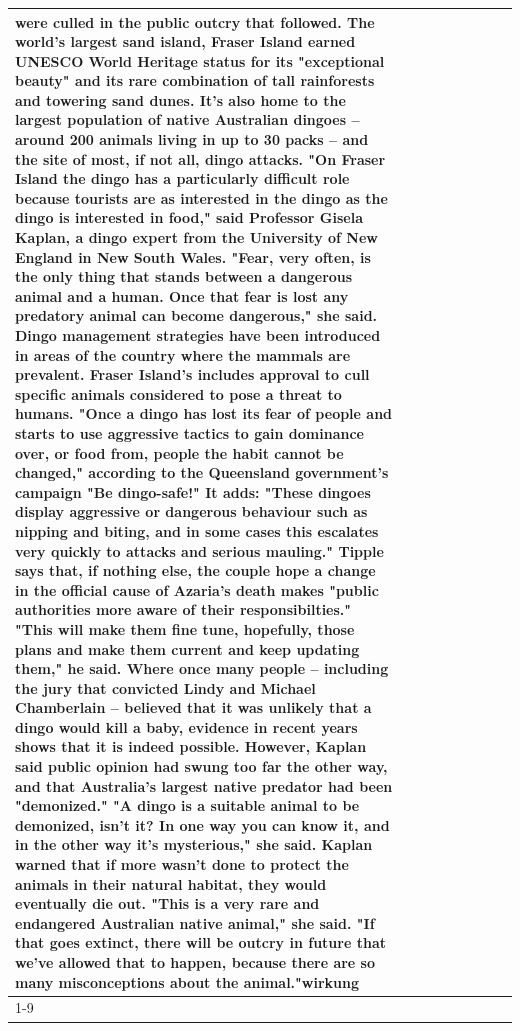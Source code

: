 \begin{table}[H]
\begin{tabular}{lllrlllll}
were culled in the public outcry that followed. The world's largest sand island, Fraser Island earned UNESCO World Heritage status for its "exceptional beauty" and its rare combination of tall rainforests and towering sand dunes. It's also home to the largest population of native Australian dingoes -- around 200 animals living in up to 30 packs -- and the site of most, if not all, dingo attacks. "On Fraser Island the dingo has a particularly difficult role because tourists are as interested in the dingo as the dingo is interested in food," said Professor Gisela Kaplan, a dingo expert from the University of New England in New South Wales. "Fear, very often, is the only thing that stands between a dangerous animal and a human. Once that fear is lost any predatory animal can become dangerous," she said. Dingo management strategies have been introduced in areas of the country where the mammals are prevalent. Fraser Island's includes approval to cull specific animals considered to pose a threat to humans. "Once a dingo has lost its fear of people and starts to use aggressive tactics to gain dominance over, or food from, people the habit cannot be changed," according to the Queensland government's campaign "Be dingo-safe!" It adds: "These dingoes display aggressive or dangerous behaviour such as nipping and biting, and in some cases this escalates very quickly to attacks and serious mauling." Tipple says that, if nothing else, the couple hope a change in the official cause of Azaria's death makes "public authorities more aware of their responsibilties." "This will make them fine tune, hopefully, those plans and make them current and keep updating them," he said. Where once many people -- including the jury that convicted Lindy and Michael Chamberlain -- believed that it was unlikely that a dingo would kill a baby, evidence in recent years shows that it is indeed possible. However, Kaplan said public opinion had swung too far the other way, and that Australia's largest native predator had been "demonized." "A dingo is a suitable animal to be demonized, isn't it? In one way you can know it, and in the other way it's mysterious," she said. Kaplan warned that if more wasn't done to protect the animals in their natural habitat, they would eventually die out. "This is a very rare and endangered Australian native animal," she said. "If that goes extinct, there will be outcry in future that we've allowed that to happen, because there are so many misconceptions about the animal."wirkung \\
\cline{1-9}

\end{tabular}
\end{table}
